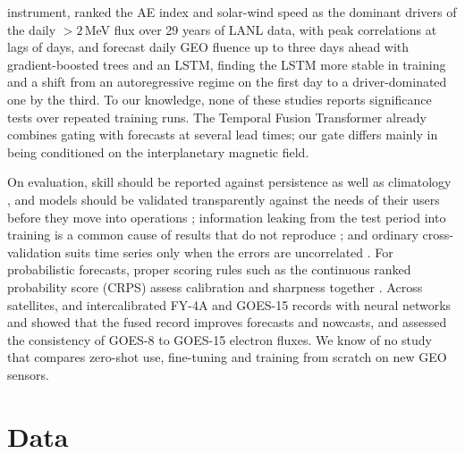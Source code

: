 \documentclass[a4paper,fleqn]{cas-dc}
\begin{document}
instrument, \citet{geletaw2024} ranked the AE index and solar-wind speed as the dominant drivers of the daily
\(>2\)\,MeV flux over 29 years of LANL data, with peak correlations at lags of days, and \citet{azragorskaya2026} forecast daily GEO fluence
up to three days ahead with gradient-boosted trees and an LSTM, finding the LSTM more stable in training and a
shift from an autoregressive regime on the first day to a driver-dominated one by the third. To our knowledge,
none of these studies reports significance tests over repeated training runs. The Temporal Fusion Transformer \citep{lim2021} already combines gating with forecasts at several lead
times; our gate differs mainly in being conditioned on the interplanetary magnetic field.

On evaluation, skill should be reported against persistence as well as climatology
\citep{camporeale2019,morley2018}, and models should be validated transparently against the needs of their
users before they move into operations \citep{kuznetsova2026}; information leaking from the test period into training is a common cause
of results that do not reproduce \citep{kapoor2023}; and ordinary cross-validation suits time series only when
the errors are uncorrelated \citep{bergmeir2018}. For probabilistic forecasts, proper scoring rules such as the
continuous ranked probability score (CRPS) assess calibration and sharpness together \citep{gneiting2007}.
Across satellites, \citet{zhao2025} and \citet{wangb2026} intercalibrated FY-4A and GOES-15 records with neural
networks and showed that the fused record improves forecasts and nowcasts, and
\citet{rodriguez2025} assessed the consistency of GOES-8 to GOES-15 electron fluxes. We know of no study that
compares zero-shot use, fine-tuning and training from scratch on new GEO sensors.

\section{Data}
\label{sec:data}
\end{document}
